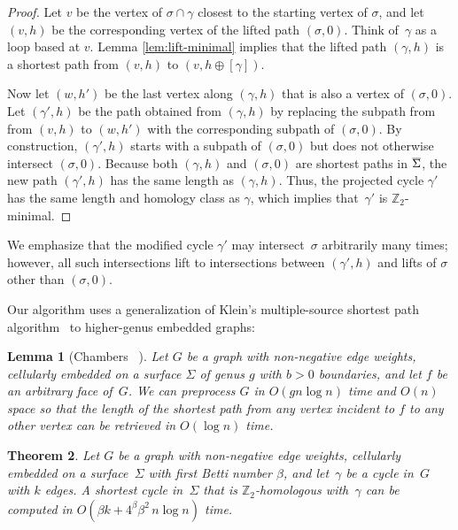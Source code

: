 \documentclass[11pt,twoside]{article}
\def\Z{\mathbb{Z}}
\def\cycle{\gamma}
\def\Sigmabar{\overline{\smash{\Sigma}\vphantom{t}}}
\newtheorem{theorem}{Theorem}[section]
\newtheorem{lemma}[theorem]{Lemma}
\begin{document}
{\begin{proof}
Let $v$ be the vertex of $\sigma\cap\cycle$ closest to the starting vertex of $\sigma$, and let $(v,h)$ be the corresponding vertex of the lifted path $(\sigma,0)$.  Think of~$\cycle$ as a loop based at $v$.  Lemma \ref{lem:lift-minimal} implies that the lifted path $(\cycle, h)$ is a shortest path from $(v,h)$ to $(v,h\oplus [\cycle])$.

Now let $(w,h')$ be the last vertex along $(\cycle,h)$ that is also a vertex of $(\sigma,0)$.  Let $(\cycle', h)$ be the path obtained from $(\cycle, h)$ by replacing the subpath from from $(v,h)$ to $(w,h')$ with the corresponding subpath of $(\sigma,0)$.  By construction, $(\cycle', h)$ starts with a subpath of $(\sigma,0)$ but does not otherwise intersect $(\sigma,0)$.   Because both $(\cycle, h)$ and $(\sigma,0)$ are shortest paths in $\Sigmabar$, the new path $(\cycle', h)$ has the same length as $(\cycle, h)$.  Thus, the projected cycle $\cycle'$ has the same length and homology class as $\cycle$, which implies that~$\cycle'$ is $\Z_2$-minimal.
\end{proof}

We emphasize that the modified cycle $\cycle'$ may intersect~$\sigma$ arbitrarily many times; however, all such intersections lift to intersections between $(\cycle', h)$ and lifts of $\sigma$ other than $(\sigma, 0)$.

Our algorithm uses a generalization of Klein's  multiple-source shortest path algorithm~\cite{k-msspp-05} to higher-genus embedded graphs:

\begin{lemma}[Chambers \etal~\cite{cce-msspe-13}]
\label{lem:multishort}
Let $G$ be a graph with non-negative edge weights, cellularly embedded on a surface $\Sigma$ of genus $g$ with $b>0$ boundaries, and let $f$ be an arbitrary face of~$G$.  We can preprocess $G$ in $O(gn\log n)$ time and $O(n)$ space so that the length of the shortest path from any vertex incident to $f$ to any other vertex can be retrieved in $O(\log n)$ time.
\end{lemma}

\begin{theorem}
\label{thm:min-cycle}
Let $G$ be a  graph with non-negative edge weights, cellularly embedded on a surface~$\Sigma$ with first Betti number $\beta$, and let~$\cycle$ be a cycle in~$G$ with $k$ edges.  A shortest cycle in~$\Sigma$ that is $\Z_2$-homologous with~$\cycle$ can be computed in $O(\beta k + 4^\beta \beta^2\, n\log n)$ time.
\end{theorem}

}
\end{document}
